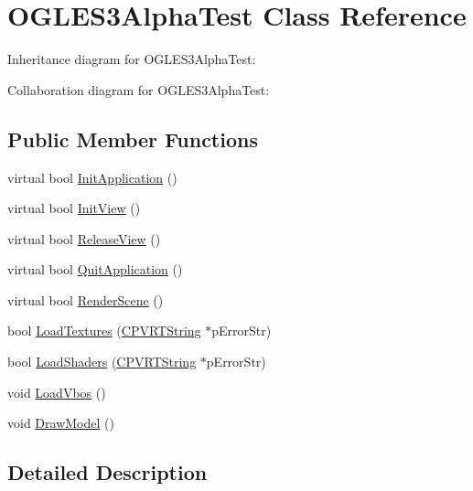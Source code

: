 \hypertarget{class_o_g_l_e_s3_alpha_test}{\section{O\+G\+L\+E\+S3\+Alpha\+Test Class Reference}
\label{class_o_g_l_e_s3_alpha_test}
}


Inheritance diagram for O\+G\+L\+E\+S3\+Alpha\+Test\+:


Collaboration diagram for O\+G\+L\+E\+S3\+Alpha\+Test\+:
\subsection*{Public Member Functions}
\begin{DoxyCompactItemize}
\item 
virtual bool \hyperlink{class_o_g_l_e_s3_alpha_test_a47a8170bf97f86c39c7407e62b5a622d}{Init\+Application} ()
\item 
virtual bool \hyperlink{class_o_g_l_e_s3_alpha_test_a2c322d4d7fc6bacff784644b42549b95}{Init\+View} ()
\item 
virtual bool \hyperlink{class_o_g_l_e_s3_alpha_test_a699c20fcd0c33ae33f997f43c2641df0}{Release\+View} ()
\item 
virtual bool \hyperlink{class_o_g_l_e_s3_alpha_test_afca2d54232797e7c5acf1f8c6a8f06cd}{Quit\+Application} ()
\item 
virtual bool \hyperlink{class_o_g_l_e_s3_alpha_test_a784344afbdbe39658ee14949b4db497a}{Render\+Scene} ()
\item 
bool \hyperlink{class_o_g_l_e_s3_alpha_test_ae9f4b3699371b1fd297e91e4ff181ceb}{Load\+Textures} (\hyperlink{class_c_p_v_r_t_string}{C\+P\+V\+R\+T\+String} $\ast$p\+Error\+Str)
\item 
bool \hyperlink{class_o_g_l_e_s3_alpha_test_ab4cd36432a1c6b2c18c67a8bc72617a4}{Load\+Shaders} (\hyperlink{class_c_p_v_r_t_string}{C\+P\+V\+R\+T\+String} $\ast$p\+Error\+Str)
\item 
void \hyperlink{class_o_g_l_e_s3_alpha_test_a3910c8962be069215395fdf60330ed38}{Load\+Vbos} ()
\item 
void \hyperlink{class_o_g_l_e_s3_alpha_test_a465a8ae1ad77a0cbabbacff48f2d6353}{Draw\+Model} ()
\end{DoxyCompactItemize}


\subsection{Detailed Description}


